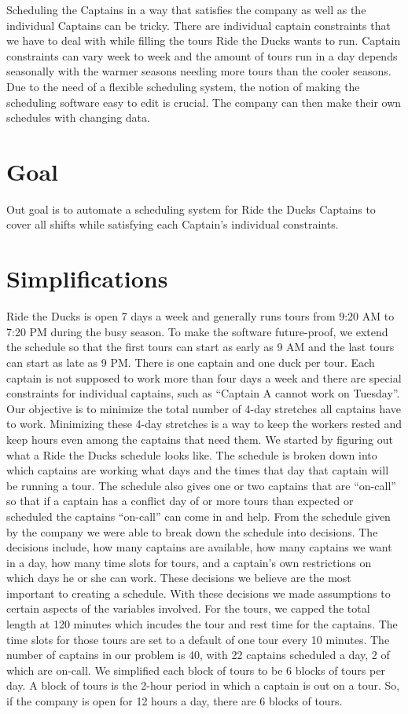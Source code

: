\documentclass[12pt]{article}
\begin{document}
Scheduling the Captains in a way that satisfies the company as well as the 
individual Captains can be tricky. There are individual captain constraints that we have to deal with while filling the tours Ride the Ducks wants to run. Captain constraints can vary week to week and the amount of tours run in a day depends seasonally with the warmer seasons needing more tours than the cooler seasons. Due to the need of a flexible scheduling system, the notion of making the scheduling software easy to edit is crucial. The company can then 
make their own schedules with changing data. 

\section*{Goal}
Out goal is to automate a scheduling system for Ride the Ducks Captains to cover all shifts while satisfying each Captain's individual constraints. %

\section*{Simplifications}
Ride the Ducks is open 7 days a week and generally runs tours from 9:20 AM to 7:20 PM during the busy season. To make the software future-proof, we extend the schedule so that the first tours can start as early as 9 AM and the last tours can start as late as 9 PM. There is one captain 
and one duck per tour. Each captain is not supposed to work more than four days a week 
and there are special constraints for individual captains, such as “Captain A cannot work 
on Tuesday”. Our objective is to minimize the total number of 4-day stretches all captains 
have to work. Minimizing these 4-day stretches is a way to keep the workers rested and 
keep hours even among the captains that need them.  We started by figuring out what a 
Ride the Ducks schedule looks like. The schedule is broken down into which captains are
working what days and the times that day that captain will be running a tour. The 
schedule also gives one or two captains that are “on-call” so that if a captain has a 
conflict day of or more tours than expected or scheduled the captains “on-call” can come 
in and help. From the schedule given by the company we were able to break down the 
schedule into decisions. The decisions include, how many captains are available, how 
many captains we want in a day, how many time slots for tours, and a captain’s own 
restrictions on which days he or she can work. These decisions we believe are the most 
important to creating a schedule. With these decisions we made assumptions to certain 
aspects of the variables involved. For the tours, we capped the total length at 120 minutes 
which incudes the tour and rest time for the captains. The time slots for those tours are set 
to a default of one tour every 10 minutes. The number of captains in our problem is 40, 
with 22 captains scheduled a day, 2 of which are on-call. We simplified each block of 
tours to be 6 blocks of tours per day. A block of tours is the 2-hour period in which a 
captain is out on a tour. So, if the company is open for 12 hours a day, there are 6 blocks 
of tours.
\end{document}

